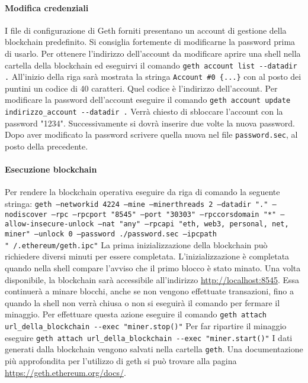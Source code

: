 \paragraph{Modifica credenziali}
I file di configurazione di Geth forniti presentano un account di gestione della blockchain predefinito. Si consiglia fortemente di modificarne la password prima di usarlo.
Per ottenere l'indirizzo dell'account da modificare aprire una shell nella cartella della blockchain ed eseguirvi il comando \newline
\texttt{geth account list -{}-datadir .} \newline
All'inizio della riga sarà mostrata la stringa \newline
\texttt{Account \#0 \{...\}} \newline con al posto dei puntini un codice di 40 caratteri. Quel codice è l'indirizzo dell'account. \newline
Per modificare la password dell'account eseguire il comando \newline
\texttt{geth account update indirizzo\_account -{}-datadir .} \newline
Verrà chiesto di sbloccare l'account con la password "1234". Successivamente si dovrà inserire due volte la nuova password. \newline
Dopo aver modificato la password scrivere quella nuova nel file \texttt{password.sec}, al posto della precedente.

\paragraph{Esecuzione blockchain}
Per rendere la blockchain operativa eseguire da riga di comando la seguente stringa:\newline
\texttt{geth --networkid 4224 --mine --minerthreads 2 --datadir "." --nodiscover --rpc --rpcport "8545" --port "30303" --rpccorsdomain "*" --allow-insecure-unlock --nat "any" --rpcapi "eth, web3, personal, net, miner" --unlock 0 --password ./password.sec --ipcpath "~/.ethereum/geth.ipc"} \newline
La prima inizializzazione della blockchain può richiedere diversi minuti per essere completata. L'inizializzazione è completata quando nella shell compare l'avviso che il primo blocco è stato minato. Una volta disponibile, la blockchain sarà accessibile all'indirizzo \url{http://localhost:8545}. Essa continuerà a minare blocchi, anche se non vengono effettuate transazioni, fino a quando la shell non verrà chiusa o non si eseguirà il comando per fermare il minaggio. Per effettuare questa azione eseguire il comando \newline
\texttt{geth attach url\_della\_blockchain -{}-exec "miner.stop()"} \newline
Per far ripartire il minaggio eseguire \newline
\texttt{geth attach url\_della\_blockchain -{}-exec "miner.start()"} \newline
I dati generati dalla blockchain vengono salvati nella cartella \texttt{geth}. \newline
Una documentazione più approfondita per l'utilizzo di geth si può trovare alla pagina \url{https://geth.ethereum.org/docs/}.



